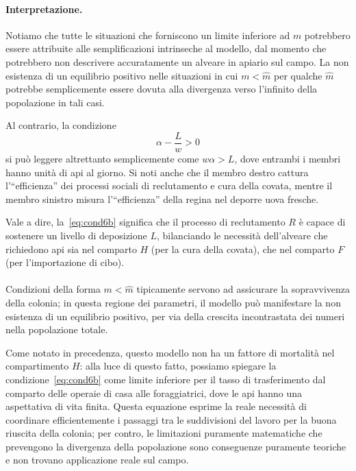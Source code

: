 \paragraph{Interpretazione.}
\label{par:interpretationCond6b}
Notiamo che tutte le situazioni che forniscono un limite inferiore ad $m$ potrebbero essere attribuite alle
semplificazioni intrinseche al modello, dal momento che potrebbero non descrivere accuratamente un alveare
in apiario sul campo. La non esistenza di un equilibrio positivo nelle situazioni in cui
$m< \hat{m}$ per qualche $\hat{m}$ potrebbe semplicemente essere dovuta alla divergenza verso l'infinito
della popolazione in tali casi.

Al contrario, la condizione
\begin{equation}
\alpha - \frac{L}{w} > 0
    \label{eq:cond6b}
\end{equation}
si può leggere altrettanto semplicemente come $w \alpha >L$, dove entrambi i membri hanno unità di api al giorno.
Si noti anche che il membro destro cattura l'``efficienza'' dei processi sociali di reclutamento e cura della
covata, mentre il membro sinistro misura l'``efficienza'' della regina nel deporre uova fresche.

Vale a dire, la~\eqref{eq:cond6b} significa che il processo di reclutamento $R$ è capace
di sostenere un livello di deposizione $L$, bilanciando le necessità dell'alveare che richiedono api sia nel
comparto $H$ (per la cura della covata), che nel comparto $F$ (per l'importazione di cibo).

\paragraph{}
Condizioni della forma $m< \hat{m}$ tipicamente servono ad assicurare la sopravvivenza della colonia;
in questa regione dei parametri, il modello può manifestare la non esistenza di un equilibrio positivo,
per via della crescita incontrastata dei numeri nella popolazione totale.

Come notato in precedenza, questo modello non ha un fattore di mortalità nel compartimento $H$: alla luce
di questo fatto, possiamo spiegare la condizione~\eqref{eq:cond6b} come limite inferiore per il tasso
di trasferimento dal comparto delle operaie di casa alle foraggiatrici, dove le api hanno una aspettativa
di vita finita.
Questa equazione esprime la reale necessità di coordinare efficientemente i passaggi tra le suddivisioni
del lavoro per la buona riuscita della colonia; per contro, le limitazioni puramente matematiche che
prevengono la divergenza della popolazione sono conseguenze puramente teoriche e non trovano applicazione
reale sul campo.

